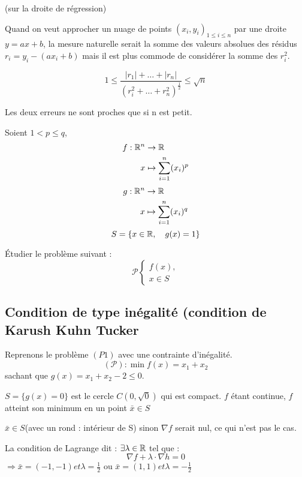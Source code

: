 
\begin{remarque} (sur la droite de régression)

	Quand on veut approcher un nuage de points $(x_i, y_i)_{1 \leq i \leq n}$ par une droite $y = ax +b$, la mesure naturelle serait la somme des valeurs absolues des résidus $r_i = y_i -(ax_i+b)$ mais il est plus commode de considérer la somme des $r_i^2$.

	\[ 1 \leq \frac{ |r_1| + \dots + |r_n| }{ (r_i^2 + \dots + r_n^2)^{\frac{1}{2}} } \leq \sqrt{n} \]
	
	Les deux erreurs ne sont proches que si n est petit.
\end{remarque}

\begin{exemple}
	Soient $1 < p \leq q$,
	\begin{align*}
	f : \mathbb{R}^n & \rightarrow  \mathbb{R} \\
	x & \mapsto \sum_{i=1}^n (x_i)^p
	\end{align*}
	\begin{align*}
	g : \mathbb{R}^n & \rightarrow  \mathbb{R} \\
	x & \mapsto \sum_{i=1}^n (x_i)^q
	\end{align*}
	\[ S = \{ x \in \mathbb{R}, \quad g(x) = 1 \} \]
	
	Étudier le problème suivant :
	\[ \mathcal{P} \begin{cases} f(x), \\ x \in S \end{cases} \]
	
	
\end{exemple}

\subsection{Condition de type inégalité (condition de Karush Kuhn Tucker}

\begin{exemple}
	Reprenons le problème $(P1)$ avec une contrainte d'inégalité.
	\[ (\mathcal{P}) : \min f(x) = x_1 + x_2 \]
	sachant que $g(x) = x_1+x_2 -2 \leq 0$.
	
	$S = \{ g(x) = 0 \}$ est le cercle $C(0, \sqrt{0})$ qui est compact. $f$ étant continue, $f$ atteint son minimum en un point $\bar{x} \in S$
	
	$\bar{x} \in S$(avec un rond : intérieur de S) sinon $\nabla f$ serait nul, ce qui n'est pas le cas.
	
	La condition de Lagrange dit : $\exists \lambda \in \mathbb{R}$ tel que : \[ \nabla f + \lambda \cdot \nabla h = 0 \]
	$\Rightarrow \bar{x} = (-1, -1) et \lambda = \frac{1}{2}$ ou $\bar{x} = (1, 1) et \lambda = -\frac{1}{2}$
	
\end{exemple}
	
